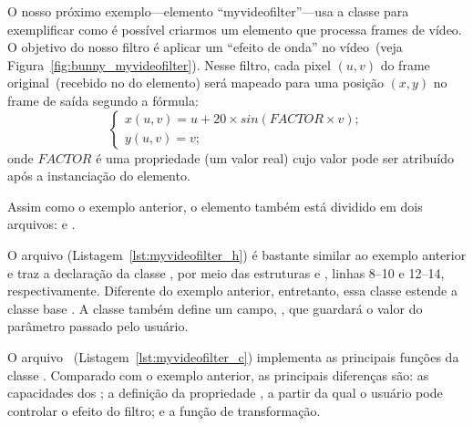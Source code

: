\begin{sloppypar}
O nosso próximo exemplo---elemento ``myvideofilter''---usa a classe
 para exemplificar como é possível criarmos um elemento que
processa frames de vídeo.  O objetivo do nosso filtro é aplicar um ``efeito de
onda'' no vídeo~(veja Figura~\ref{fig:bunny_myvideofilter}).  Nesse filtro,
cada pixel $(u, v)$ do frame original~(recebido no  do elemento)
será mapeado para uma posição $(x, y)$ no frame de saída segundo a fórmula:
\begin{equation}
  \begin{cases}
  x(u, v) = u + 20 \times sin ( FACTOR \times v); \\
  y(u, v) = v;
  \end{cases}
  \label{eq:wave_filter}
\end{equation}
onde $FACTOR$ é uma propriedade (um valor real) cujo valor pode ser atribuído
após a instanciação do elemento.
\end{sloppypar}

Assim como o exemplo anterior, o elemento  também está
dividido em dois arquivos:  e .

\begin{sloppypar}
O arquivo  (Listagem~\ref{lst:myvideofilter_h}) é bastante
similar ao exemplo anterior e traz a declaração da classe ,
por meio das estruturas  e ,
linhas 8--10 e 12--14, respectivamente.  Diferente do exemplo anterior,
entretanto, essa classe estende a classe base .  A classe
 também define um campo, , que guardará o valor do
parâmetro passado pelo usuário.
\end{sloppypar}



O arquivo ~(Listagem~\ref{lst:myvideofilter_c}) implementa
as principais funções da classe .  Comparado com o exemplo
anterior, as principais diferenças são: as capacidades dos ; a
definição da propriedade , a partir da qual o usuário pode controlar 
o efeito do filtro; e a função de transformação.



